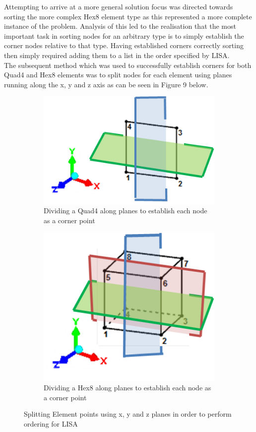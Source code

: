 \noindent
Attempting to arrive at a more general solution focus was directed towards sorting the more complex Hex8 element type as this represented a more complete instance of the problem. Analysis of this led to the realisation that the most important task in sorting nodes for an arbitrary type is to simply establish the corner nodes relative to that type. Having established corners correctly sorting then simply required adding them to a list in the order specified by LISA. \\

The subsequent method which was used to successfully establish corners for both Quad4 and Hex8 elements was to split nodes for each element using planes running along the x, y and z axis as can be seen in Figure 9 below.

\begin{figure}[!h]
\centering
\begin{subfigure}{.5\textwidth}
  \centering
  \includegraphics[width=0.9\linewidth]{../Graphics/SortingQuad4.png}
  \caption{Dividing a Quad4 along planes to establish each node as a corner point}
  \label{fig:sub1}
\end{subfigure}%
\begin{subfigure}{.5\textwidth}
  \centering
  \includegraphics[width=0.7\linewidth]{../Graphics/SortingHex8.png}
  \caption{Dividing a Hex8 along planes to establish each node as a corner point}
  \label{fig:sub2}
\end{subfigure}
\caption{Splitting Element points using x, y and z planes in order to perform ordering for LISA}
\label{fig:test}
\end{figure}

